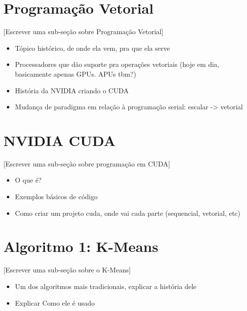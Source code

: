 \documentclass[12pt, %
openright, 
oneside, %
a4paper,    %
brazil]{facom-ufu-abntex2}
\begin{document}

\section{Programação Vetorial}

[Escrever uma sub-seção sobre Programação Vetorial]

\begin{itemize}
  \item Tópico histórico, de onde ela vem, pra que ela serve
  \item Processadores que dão suporte pra operações vetoriais (hoje em dia, basicamente apenas GPUs. APUs tbm?)
  \item História da NVIDIA criando o CUDA
  \item Mudança de paradigma em relação à programação serial: escalar -> vetorial
\end{itemize}




\section{NVIDIA CUDA}

[Escrever uma sub-seção sobre programação em CUDA]

\begin{itemize}
  \item O que é?
  \item Exemplos básicos de código  
  \item Como criar um projeto cuda, onde vai cada parte (sequencial, vetorial, etc)
\end{itemize}




\section{Algoritmo 1: K-Means}

[Escrever uma sub-seção sobre o K-Means]

\begin{itemize}  
  \item Um dos algoritmos mais tradicionais, explicar a história dele
  \item Explicar Como ele é usado
\end{itemize}
\end{document}
